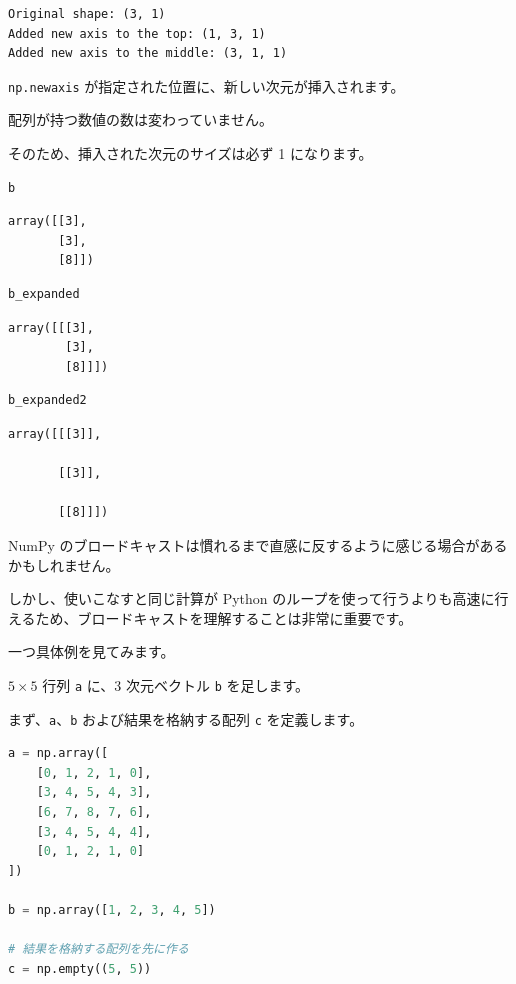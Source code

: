 \begin{lstlisting}[style=outputcell]
Original shape: (3, 1)
Added new axis to the top: (1, 3, 1)
Added new axis to the middle: (3, 1, 1)
\end{lstlisting}

\texttt{np.newaxis} が指定された位置に、新しい次元が挿入されます。

配列が持つ数値の数は変わっていません。

そのため、挿入された次元のサイズは必ず 1 になります。


\begin{lstlisting}[style=codecell,language=Python]
b
\end{lstlisting}

\begin{lstlisting}[style=outputcell]
array([[3],
       [3],
       [8]])
\end{lstlisting}

\begin{lstlisting}[style=codecell,language=Python]
b_expanded
\end{lstlisting}

\begin{lstlisting}[style=outputcell]
array([[[3],
        [3],
        [8]]])
\end{lstlisting}

\begin{lstlisting}[style=codecell,language=Python]
b_expanded2
\end{lstlisting}

\begin{lstlisting}[style=outputcell]
array([[[3]],

       [[3]],

       [[8]]])
\end{lstlisting}

NumPy のブロードキャストは慣れるまで直感に反するように感じる場合があるかもしれません。

しかし、使いこなすと同じ計算が Python のループを使って行うよりも高速に行えるため、ブロードキャストを理解することは非常に重要です。

一つ具体例を見てみます。


$5 \times 5$ 行列 \texttt{a} に、3 次元ベクトル \texttt{b} を足します。

まず、\texttt{a}、\texttt{b} および結果を格納する配列 \texttt{c} を定義します。


\begin{lstlisting}[style=codecell,language=Python]
a = np.array([
    [0, 1, 2, 1, 0],
    [3, 4, 5, 4, 3],
    [6, 7, 8, 7, 6],
    [3, 4, 5, 4, 4],
    [0, 1, 2, 1, 0]
])

b = np.array([1, 2, 3, 4, 5])

# 結果を格納する配列を先に作る
c = np.empty((5, 5))
\end{lstlisting}

